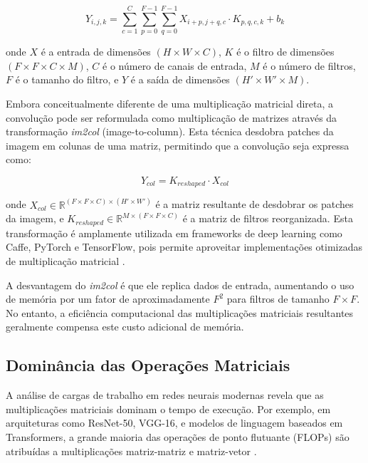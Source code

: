 \documentclass[12pt,a4paper]{article}
\begin{document}
\begin{equation}
Y_{i,j,k} = \sum_{c=1}^{C} \sum_{p=0}^{F-1} \sum_{q=0}^{F-1} X_{i+p, j+q, c} \cdot K_{p,q,c,k} + b_k
\end{equation}

onde $X$ é a entrada de dimensões $(H \times W \times C)$, $K$ é o filtro de dimensões $(F \times F \times C \times M)$, $C$ é o número de canais de entrada, $M$ é o número de filtros, $F$ é o tamanho do filtro, e $Y$ é a saída de dimensões $(H' \times W' \times M)$.

Embora conceitualmente diferente de uma multiplicação matricial direta, a convolução pode ser reformulada como multiplicação de matrizes através da transformação \textit{im2col} (image-to-column). Esta técnica desdobra patches da imagem em colunas de uma matriz, permitindo que a convolução seja expressa como:

\begin{equation}
Y_{col} = K_{reshaped} \cdot X_{col}
\end{equation}

onde $X_{col} \in \mathbb{R}^{(F \times F \times C) \times (H' \times W')}$ é a matriz resultante de desdobrar os patches da imagem, e $K_{reshaped} \in \mathbb{R}^{M \times (F \times F \times C)}$ é a matriz de filtros reorganizada. Esta transformação é amplamente utilizada em frameworks de deep learning como Caffe, PyTorch e TensorFlow, pois permite aproveitar implementações otimizadas de multiplicação matricial \cite{chellapilla_gemm_2006}.

A desvantagem do \textit{im2col} é que ele replica dados de entrada, aumentando o uso de memória por um fator de aproximadamente $F^2$ para filtros de tamanho $F \times F$. No entanto, a eficiência computacional das multiplicações matriciais resultantes geralmente compensa este custo adicional de memória.

\subsection{Dominância das Operações Matriciais}

A análise de cargas de trabalho em redes neurais modernas revela que as multiplicações matriciais dominam o tempo de execução. Por exemplo, em arquiteturas como ResNet-50, VGG-16, e modelos de linguagem baseados em Transformers, a grande maioria das operações de ponto flutuante (FLOPs) são atribuídas a multiplicações matriz-matriz e matriz-vetor \cite{jouppi_tpu_paper_2017}.
\end{document}
